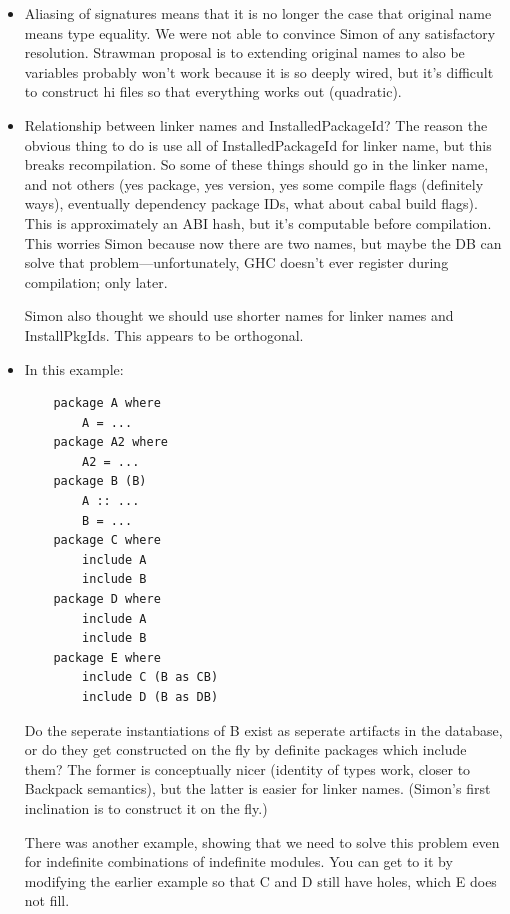 \documentclass{article}
\begin{document}
\begin{itemize}
    \item Aliasing of signatures means that it is no longer the case that
      original name means type equality.  We were not able to convince
      Simon of any satisfactory resolution.  Strawman proposal is to
      extending original names to also be variables probably won't work
      because it is so deeply wired, but it's difficult to construct hi
      files so that everything works out (quadratic).

  \item Relationship between linker names and InstalledPackageId? The reason
      the obvious thing to do is use all of InstalledPackageId for linker
      name, but this breaks recompilation.  So some of these things
      should go in the linker name, and not others (yes package, yes
      version, yes some compile flags (definitely ways), eventually
      dependency package IDs, what about cabal build flags).  This is
      approximately an ABI hash, but it's computable before compilation.
      This worries Simon because now there are two names, but maybe
      the DB can solve that problem---unfortunately, GHC doesn't ever
      register during compilation; only later.

        Simon also thought we should use shorter names for linker
        names and InstallPkgIds.  This appears to be orthogonal.

    \item In this example:

\begin{verbatim}
    package A where
        A = ...
    package A2 where
        A2 = ...
    package B (B)
        A :: ...
        B = ...
    package C where
        include A
        include B
    package D where
        include A
        include B
    package E where
        include C (B as CB)
        include D (B as DB)
\end{verbatim}

      Do the seperate instantiations of B exist as seperate artifacts
      in the database, or do they get constructed on the fly by
      definite packages which include them?  The former is conceptually
      nicer (identity of types work, closer to Backpack semantics), but
      the latter is easier for linker names. (Simon's first inclination
      is to construct it on the fly.)

      There was another example, showing that we need to solve this
      problem even for indefinite combinations of indefinite modules.
      You can get to it by modifying the earlier example so that C and
      D still have holes, which E does not fill.


\end{itemize}
\end{document}
